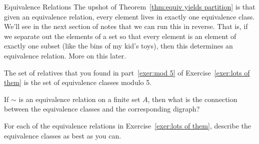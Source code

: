 \begin{section}{Equivalence Relations}
The upshot of Theorem~\ref{thm:equiv yields partition} is that given an equivalence relation, every element lives in exactly one equivalence class.  We'll see in the next section of notes that we can run this in reverse.  That is, if we separate out the elements of a set so that every element is an element of exactly one subset (like the bins of my kid's toys), then this determines an equivalence relation.  More on this later.

\begin{example}
The set of relatives that you found in part~\ref{exer:mod 5} of Exercise~\ref{exer:lots of them} is the set of equivalence classes modulo 5.
\end{example}

\begin{exercise}
If $\sim$ is an equivalence relation on a finite set $A$, then what is the connection between the equivalence classes and the corresponding digraph?
\end{exercise}

\begin{exercise}
For each of the equivalence relations in Exercise~\ref{exer:lots of them}, describe the equivalence classes as best as you can.
\end{exercise}

\end{section}